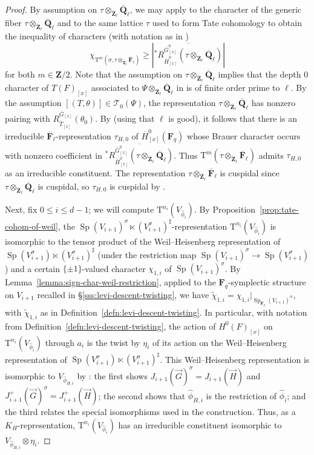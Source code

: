 \documentclass[reqno]{amsart}
\numberwithin{equation}{subsection}
\newcommand{\F}{\mathbf{F}}
\newcommand{\wt}[1]{\widetilde{#1}}
\newcommand{\Q}{\mathbf{Q}}
\newcommand{\Z}{\mathbf{Z}}
\newcommand{\ol}[1]{\overline{#1}}
\newcommand{\wh}[1]{\widehat{#1}}
\newcommand\cT{\mathcal{T}}
\DeclareMathOperator{\Sp}{Sp}
\newcommand{\rT}{\ensuremath{\mathrm{T}}\xspace}
\theoremstyle{remark}
\numberwithin{equation}{subsection}
\numberwithin{figure}{subsection}
\begin{document}
\begin{proof}
By assumption on $\tau \otimes_{\ol\Z_\ell} \ol\Q_\ell$, we may apply \cite[Proposition~3.4.1(2)]{Cot26b} to the character of the generic fiber $\tau\otimes_{\ol\Z_\ell}\ol\Q_\ell$ and to the same lattice $\tau$ used to form Tate cohomology to obtain the inequality of characters (with notation as in \cite[\S 3.2]{Cot26b})
\[
\chi_{\rT^m(\sigma,\tau\otimes_{\ol\Z_\ell}\ol\F_\ell)}
\geq 
\left|\ol{{}^*R^{\ol G^0_{[x]}}_{\ol H^0_{[x]}}
(\tau\otimes_{\ol\Z_\ell}\ol\Q_\ell)}\right|
\]
for both $m \in \Z/2$. Note that the assumption on $\tau \otimes_{\ol\Z_\ell} \ol\Q_\ell$ implies that the depth $0$ character of $T(F)_{[x]}$ associated to $\Psi \otimes_{\ol\Z_\ell} \ol\Q_\ell$ in \cite[\S 7.2]{CF26a} is of finite order prime to $\ell$. By the assumption $[(T, \theta)] \in \cT_0(\Psi)$, the representation $\tau \otimes_{\ol\Z_\ell} \ol\Q_\ell$ has nonzero pairing with $R_{\ol T_{[x]}}^{\ol G_{[x]}}(\theta_0)$. By \cite[Proposition~3.4.1]{Cot26b} (using that $\ell$ is good), it follows that there is an irreducible $\ol\F_\ell$-representation $\tau_{H,0}$ of $\ol H^0_{[x]}(\F_q)$ whose Brauer character occurs with nonzero coefficient in $\ol{{}^*R^{\ol G^0_{[x]}}_{\ol H^0_{[x]}}(\tau \otimes_{\ol\Z_\ell}\ol\Q_\ell)}$. Thus $\rT^m(\tau\otimes_{\ol\Z_\ell}\ol\F_\ell)$ admits $\tau_{H,0}$ as an irreducible constituent. The representation $\tau\otimes_{\ol\Z_\ell}\ol\F_\ell$ is cuspidal since $\tau \otimes_{\ol\Z_\ell} \ol\Q_\ell$ is cuspidal, so $\tau_{H,0}$ is cuspidal by \cite[Proposition~3.4.2]{Cot26b}.

Next, fix $0\leq i\leq d-1$; we will compute $\rT^{n_i}(V_{\wh\phi_i})$. By Proposition~\ref{prop:tate-cohom-of-weil}, the $\Sp(V_{i+1})^\sigma \ltimes (V_{i+1}^\sigma)^\sharp$-representation $\rT^{n_i}(V_{\wh\phi_i})$ is isomorphic to the tensor product of the Weil--Heisenberg representation of $\Sp(V_{i+1}^\sigma) \ltimes (V_{i+1}^\sigma)^\sharp$ (under the restriction map $\Sp(V_{i+1})^\sigma \to \Sp(V_{i+1}^\sigma)$) and a certain $\{\pm1\}$-valued character $\chi_{1,i}$ of $\Sp(V_{i+1})^\sigma$. By Lemma~\ref{lemma:sign-char-weil-restriction}, applied to the $\F_q$-symplectic structure on $V_{i+1}$ recalled in \S\ref{sss:levi-descent-twisting}, we have $\wt\chi_{1,i} = \chi_{1,i}|_{\Sp_{\F_q}(V_{i+1})^\sigma}$, with $\wt\chi_{1,i}$ as in Definition~\ref{defn:levi-descent-twisting}. In particular, with notation from Definition~\ref{defn:levi-descent-twisting}, the action of $H^0(F)_{[x]}$ on $\rT^{n_i}(V_{\wh\phi_i})$ through $a_i$ is the twist by $\eta_i$ of its action on the Weil--Heisenberg representation of $\Sp(V_{i+1}^\sigma) \ltimes (V_{i+1}^\sigma)^\sharp$. This Weil--Heisenberg representation is isomorphic to $V_{\wh\phi_{H,i}}$ by \cite[Lemmas~6.4.4(1), 6.4.3(1), and 6.4.5(1)]{CF26a}: the first shows $J_{i+1}(\vec G)^\sigma = J_{i+1}(\vec H)$ and $J_{i+1}^+(\vec G)^\sigma = J_{i+1}^+(\vec H)$; the second shows that $\wh\phi_{H,i}$ is the restriction of $\wh\phi_i$; and the third relates the special isomorphisms used in the construction. Thus, as a $K_H$-representation, $\rT^{n_i}(V_{\wh\phi_i})$ has an irreducible constituent isomorphic to $V_{\wh\phi_{H,i}}\otimes\eta_i$.


\end{proof}
\end{document}
